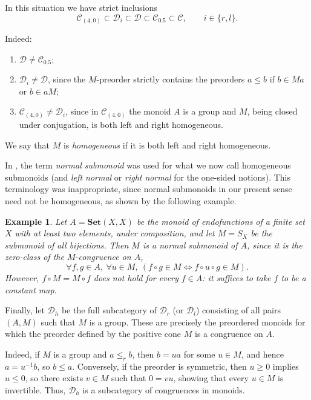 \documentclass[12pt]{article}
\newcommand{\Set}{\mathbf{Set}}
\newtheorem{example}{Example}
\begin{document}
In this situation we have strict inclusions
\[
\mathcal{C}_{(4,0)} \subset \mathcal{D}_i \subset \mathcal{D} \subset \mathcal{C}_{0.5} \subset \mathcal{C},
\qquad i\in\{r,l\}.
\]

Indeed:
\begin{enumerate}
\item $\mathcal{D}\neq \mathcal{C}_{0.5}$;
\item $\mathcal{D}_i\neq \mathcal{D}$, since the $M$-preorder strictly contains the preorders $a\leq b$ if $b\in Ma$ or $b\in aM$;
\item $\mathcal{C}_{(4,0)}\neq \mathcal{D}_i$, since in $\mathcal{C}_{(4,0)}$ the monoid $A$ is a group and $M$, being closed under conjugation, is both left and right homogeneous.
\end{enumerate}

We say that $M$ is {\em homogeneous} if it is both left and right homogeneous.

In \cite{MFS2}, the term {\em normal submonoid} was used for what we now call homogeneous submonoids (and {\em left normal} or {\em right normal} for the one-sided notions). This terminology was inappropriate, since normal submonoids in our present sense need not be homogeneous, as shown by the following example.

\begin{example}\em
Let $A=\Set(X,X)$ be the monoid of endofunctions of a finite set $X$ with at least two elements, under composition, and let $M=S_X$ be the submonoid of all bijections. Then $M$ is a normal submonoid of $A$, since it is the zero-class of the $M$-congruence on $A$,
\[
\forall f,g\in A,\ \forall u\in M,\ (f\circ g\in M \Leftrightarrow f\circ u\circ g\in M).
\]
However, $f\circ M = M\circ f$ does not hold for every $f\in A$: it suffices to take $f$ to be a constant map.
\end{example}

Finally, let $\mathcal{D}_h$ be the full subcategory of $\mathcal{D}_r$ (or $\mathcal{D}_l$) consisting of all pairs $(A,M)$ such that $M$ is a group. These are precisely the preordered monoids for which the preorder defined by the positive cone $M$ is a congruence on $A$.

Indeed, if $M$ is a group and $a\leq_r b$, then $b=ua$ for some $u\in M$, and hence $a=u^{-1}b$, so $b\leq a$. Conversely, if the preorder is symmetric, then $u\geq 0$ implies $u\leq 0$, so there exists $v\in M$ such that $0=vu$, showing that every $u\in M$ is invertible. 
 Thus, $\mathcal{D}_h$ is a subcategory of congruences in monoids. 
 
\end{document}
